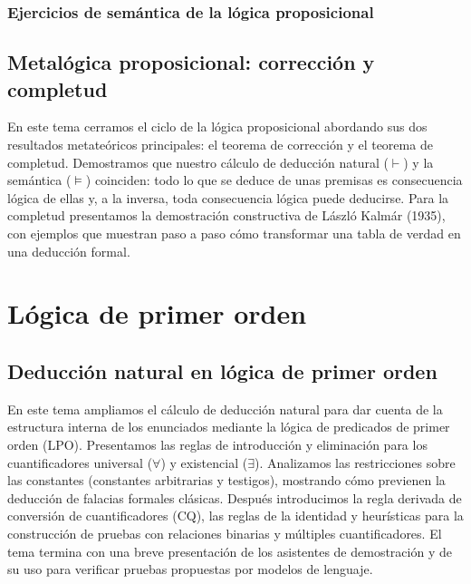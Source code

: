 \documentclass[spanish,11pt,a4paper,openany]{book}
\begin{document}
\section{Ejercicios de semántica de la lógica proposicional}


\chapter{Metalógica proposicional: corrección y completud}\label{cap:meta-prop}
\begin{resumentema}
En este tema cerramos el ciclo de la lógica proposicional abordando
sus dos resultados metateóricos principales: el teorema de corrección y el
teorema de completud. Demostramos que nuestro cálculo de deducción
natural ($\vdash$) y la semántica ($\models$)
coinciden: todo lo que se deduce de unas premisas es consecuencia
lógica de ellas y, a la inversa, toda consecuencia lógica puede
deducirse. Para la completud
presentamos la demostración constructiva de László Kalmár
(1935), con ejemplos que muestran paso a paso
cómo transformar una tabla de verdad en una deducción formal. 
\end{resumentema}



\part{Lógica de primer orden}

\chapter{Deducción natural en lógica de primer orden}\label{cap:dn-lpo}
\begin{resumentema}
En este tema ampliamos el cálculo de deducción natural para dar cuenta
de la estructura interna de los enunciados mediante la lógica de
predicados de primer orden (LPO). Presentamos las reglas de
introducción y eliminación para los cuantificadores universal ($\forall$)
y existencial ($\exists$). Analizamos las restricciones
sobre las constantes (constantes arbitrarias y testigos), mostrando cómo previenen la deducción de
falacias formales clásicas. Después introducimos la regla derivada
de conversión de cuantificadores (CQ), las reglas de la identidad y
heurísticas para la construcción de pruebas con relaciones binarias y
múltiples cuantificadores. El tema termina con una breve presentación
de los asistentes de demostración y de su uso para verificar pruebas
propuestas por modelos de lenguaje. 
\end{resumentema}
\end{document}
